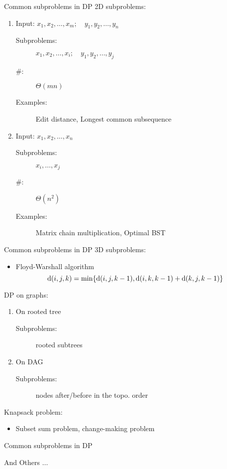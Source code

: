 \begin{frame}{Common subproblems in DP}
  2D subproblems:
  \begin{enumerate}
	\item Input: $x_{1}, x_{2}, \dots, x_{m}; \quad y_{1}, y_{2}, \dots, y_{n}$
	  \begin{description}
		\item[Subproblems:] $x_{1}, x_{2}, \dots, x_{i}; \quad y_{1}, y_{2}, \dots, y_{j}$
		\item[\#:] $\Theta(mn)$
		  \pause
		\item[Examples:] Edit distance, Longest common subsequence
	  \end{description}
	  \pause
	  \vspace{0.30cm}
	\item Input: $x_{1}, x_{2}, \dots, x_{n}$
	  \begin{description}
		\item[Subproblems:] $x_{i}, \dots, x_{j}$
		\item[\#:] $\Theta(n^{2})$
		  \pause
		\item[Examples:] Matrix chain multiplication, Optimal BST
	  \end{description}
  \end{enumerate}
\end{frame}
\begin{frame}{Common subproblems in DP}
  3D subproblems:
  \begin{itemize}
	\item Floyd-Warshall algorithm
	  \[
		\text{d}(i,j,k) = \min \{\text{d}(i,j,k-1), \text{d}(i,k,k-1) + \text{d}(k,j,k-1)\}
	  \]
  \end{itemize}

  \pause
  DP on graphs:
  \begin{enumerate}
	\item On rooted tree
	  \begin{description}
		\item[Subproblems:] rooted subtrees
	  \end{description}
	\item On DAG
	  \begin{description}
		\item[Subproblems:] nodes after/before in the topo. order
	  \end{description}
  \end{enumerate}

  \pause
  \vspace{0.30cm}
  Knapsack problem:
  \begin{itemize}
	\item Subset sum problem, change-making problem
  \end{itemize}
\end{frame}
\begin{frame}{Common subproblems in DP}
  \centerline{\Huge And Others $\dots$}
\end{frame}
